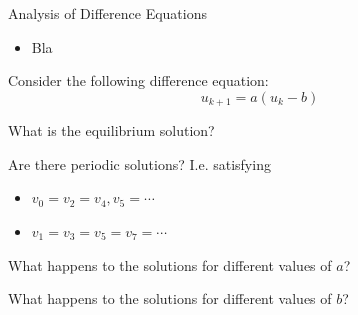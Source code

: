 %
%
%
%
%
%	
%	
%
%
%
%
%	
%
%
%
%
%
%
%
%
%

%
%



\begin{module}{Analysis of Difference Equations}
	\label{diff:analysis}

	
	
\end{module}



\begin{lesson}

	\begin{itemize}
		\item Bla
	\end{itemize}
	

\end{lesson}


\newpage


\question 
	Consider the following difference equation:
		$$u_{k+1} = a(u_k - b)$$

	\begin{parts}
		\item What is the equilibrium solution?
		\item Are there periodic solutions? I.e. satisfying
		\begin{itemize}
			\item $v_0=v_2=v_4,v_5=\cdots$
			\item $v_1=v_3=v_5=v_7=\cdots$
		\end{itemize} 
		\item What happens to the solutions for different values of $a$?
		\item What happens to the solutions for different values of $b$?
	\end{parts}


